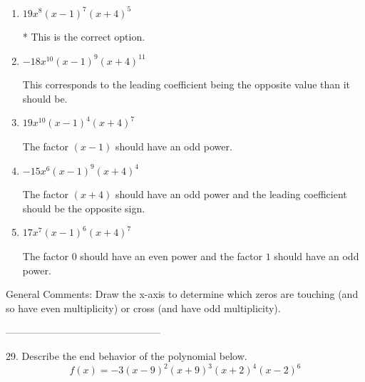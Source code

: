 \documentclass{extbook}[14pt]
\begin{document}
\begin{enumerate}[label=\Alph*.] 
\item $ 19x^{8} (x - 1)^{7} (x + 4)^{5} $ 

 * This is the correct option. 
\item $ -18x^{10} (x - 1)^{9} (x + 4)^{11} $ 

 This corresponds to the leading coefficient being the opposite value than it should be. 
\item $ 19x^{10} (x - 1)^{4} (x + 4)^{7} $ 

 The factor $(x - 1)$ should have an odd power. 
\item $ -15x^{6} (x - 1)^{9} (x + 4)^{4} $ 

 The factor $(x + 4)$ should have an odd power and the leading coefficient should be the opposite sign. 
\item $ 17x^{7} (x - 1)^{6} (x + 4)^{7} $ 

 The factor $0$ should have an even power and the factor $1$ should have an odd power. 
\end{enumerate} 
 
General Comments: Draw the x-axis to determine which zeros are touching (and so have even multiplicity) or cross (and have odd multiplicity).

-----------------------------------------------

29. Describe the end behavior of the polynomial below.
\[ f(x) = -3(x - 9)^{2}(x + 9)^{3}(x + 2)^{4}(x - 2)^{6} \] 
\end{document}

